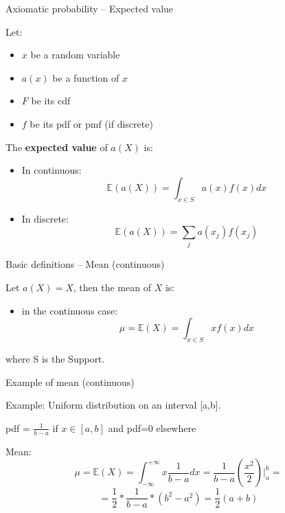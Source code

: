 \documentclass{beamer}
\begin{document}
\begin{frame}
{\centerline{Axiomatic probability -- Expected value}}

Let:
\begin{itemize}
\item $x$ be a random variable
\item $a(x)$ be a function of $x$
\item $F$ be its cdf
\item $f$ be its pdf or pmf (if discrete)
\end{itemize}

The \textbf{expected value} of $a(X)$ is:

\begin{itemize}
\item In continuous:
 $$\mathbb{E}(a(X)) = \int_{x \in S} a(x)f(x)dx$$
\item In discrete: 
 $$\mathbb{E}(a(X)) = \sum_{j} a(x_j)f(x_j)$$
\end{itemize}


\end{frame}

\begin{frame}
{\centerline{Basic definitions -- Mean (continuous)}}


Let $ a(X) = X$, then the mean of $X$ is: \\
\begin{itemize}
\item in the continuous case: $$\mu = \mathbb{E}(X) = \int_{x \in S} xf(x)dx $$
\end{itemize}
where S is the Support.

\end{frame}


\begin{frame}
{\centerline{Example of mean (continuous)}}


Example: Uniform distribution on an interval [a,b]. 

pdf = $\frac{1}{b-a}$ if $x \in [a,b]$ and pdf=0 elsewhere

Mean: $$\mu = \mathbb{E}(X) = \int_{-\infty}^{+\infty} x \frac{1}{b-a} dx  = \frac{1}{b-a} \left(\frac{x^2}{2}\right)\bigg|_a^b =$$ $$= \frac{1}{2} * \frac{1}{b-a} * (b^2 - a^2) = \frac{1}{2} (a+b) $$ 




\end{frame}
\end{document}
